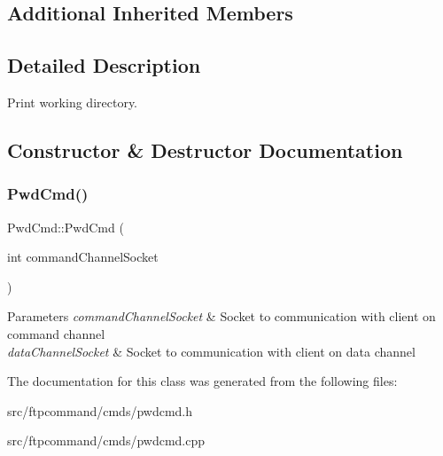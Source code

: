 \subsection*{Additional Inherited Members}


\subsection{Detailed Description}
Print working directory. 

\subsection{Constructor \& Destructor Documentation}
\mbox{\label{classPwdCmd_a6c80d206530ca06570356473eaca802a}} 
\subsubsection{\texorpdfstring{Pwd\+Cmd()}{PwdCmd()}}
{\footnotesize\ttfamily Pwd\+Cmd\+::\+Pwd\+Cmd (\begin{DoxyParamCaption}\item[{int}]{command\+Channel\+Socket }\end{DoxyParamCaption})}


\begin{DoxyParams}{Parameters}
{\em command\+Channel\+Socket} & Socket to communication with client on command channel \\
\hline
{\em data\+Channel\+Socket} & Socket to communication with client on data channel \\
\hline
\end{DoxyParams}


The documentation for this class was generated from the following files\+:\begin{DoxyCompactItemize}
\item 
src/ftpcommand/cmds/pwdcmd.\+h\item 
src/ftpcommand/cmds/pwdcmd.\+cpp\end{DoxyCompactItemize}
